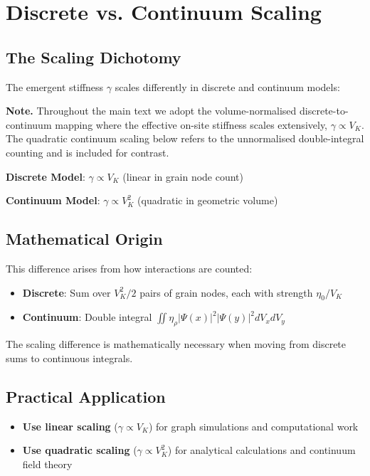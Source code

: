 \documentclass[11pt]{article}
\begin{document}
\section{Discrete vs. Continuum Scaling}\label{si:scaling}

\subsection{The Scaling Dichotomy}

The emergent stiffness $\gamma$ scales differently in discrete and continuum models:

\textbf{Note.} Throughout the main text we adopt the volume-normalised discrete-to-continuum mapping where the effective on-site stiffness scales extensively, $\gamma \propto V_K$. The quadratic continuum scaling below refers to the unnormalised double-integral counting and is included for contrast.

\textbf{Discrete Model}: $\gamma \propto V_K$ (linear in grain node count)

\textbf{Continuum Model}: $\gamma \propto V_K^2$ (quadratic in geometric volume)

\subsection{Mathematical Origin}

This difference arises from how interactions are counted:
\begin{itemize}
\item \textbf{Discrete}: Sum over $V_K^2/2$ pairs of grain nodes, each with strength $\eta_0/V_K$
\item \textbf{Continuum}: Double integral $\iint \eta_\rho |\Psi(x)|^2|\Psi(y)|^2 dV_x dV_y$
\end{itemize}

The scaling difference is mathematically necessary when moving from discrete sums to continuous integrals.

\subsection{Practical Application}

\begin{itemize}
\item \textbf{Use linear scaling} ($\gamma \propto V_K$) for graph simulations and computational work
\item \textbf{Use quadratic scaling} ($\gamma \propto V_K^2$) for analytical calculations and continuum field theory
\end{itemize}
\end{document}
